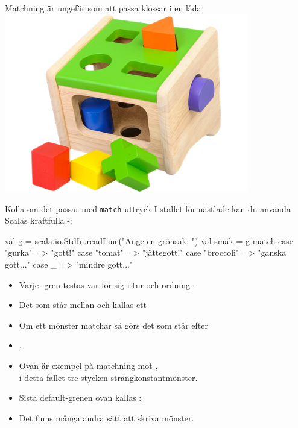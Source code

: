 \ifkompendium\else
\begin{SlideExtra}{Matchning är ungefär som att passa klossar i en låda}
\includegraphics[width=0.8\textwidth]{../img/plocklada.png}
\end{SlideExtra}
\fi


\begin{Slide}{Kolla om det passar med \texttt{match}-uttryck}\SlideFontSmall
I stället för nästlade  kan du använda Scalas kraftfulla -:

\begin{Code}
val g = scala.io.StdIn.readLine("Ange en grönsak: ")
val smak = 
  g match 
    case "gurka"    => "gott!"
    case "tomat"    => "jättegott!"
    case "broccoli" => "ganska gott..."
    case _ => "mindre gott..."
\end{Code}
\begin{itemize}
\pause\item Varje -gren testas var för sig i tur och ordning .
\item Det som står mellan  och \code{=>} kallas ett  
\item Om ett mönster matchar så görs det som står efter \code{=>} 
\item {}.  
\item Ovan är exempel på matchning mot , \\ i detta fallet tre stycken strängkonstantmönster.
\item Sista default-grenen ovan kallas : 
\item Det finns många andra sätt att skriva mönster.
\end{itemize}

\end{Slide}

